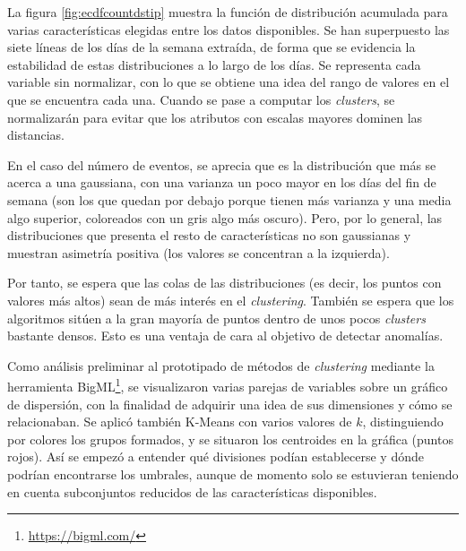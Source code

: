 La figura \ref{fig:ecdfcountdstip} muestra la función de distribución acumulada para varias características elegidas entre los datos disponibles.
Se han superpuesto las siete líneas de los días de la semana extraída, de forma que se evidencia la estabilidad de estas distribuciones a lo largo de los días.
Se representa cada variable sin normalizar, con lo que se obtiene una idea del rango de valores en el que se encuentra cada una.
Cuando se pase a computar los \emph{clusters}, se normalizarán para evitar que los atributos con escalas mayores dominen las distancias.

En el caso del número de eventos, se aprecia que es la distribución que más se acerca a una gaussiana, con una varianza un poco mayor en los días del fin de semana
(son los que quedan por debajo porque tienen más varianza y una media algo superior, coloreados con un gris algo más oscuro).
Pero, por lo general, las distribuciones que presenta el resto de características no son gaussianas y muestran asimetría positiva (los valores se concentran a la izquierda).

Por tanto, se espera que las colas de las distribuciones (es decir, los puntos con valores más altos) sean de más interés en el \emph{clustering}.
También se espera que los algoritmos sitúen a la gran mayoría de puntos dentro de unos pocos \emph{clusters} bastante densos.
Esto es una ventaja de cara al objetivo de detectar anomalías.

Como análisis preliminar al prototipado de métodos de \emph{clustering} mediante la herramienta BigML\footnote{\url{https://bigml.com/}},
se visualizaron varias parejas de variables sobre un gráfico de dispersión, con la finalidad de adquirir una idea de sus dimensiones y cómo se relacionaban.
Se aplicó también K-Means con varios valores de $k$, distinguiendo por colores los grupos formados, y se situaron los centroides en la gráfica (puntos rojos).
Así se empezó a entender qué divisiones podían establecerse y dónde podrían encontrarse los umbrales,
aunque de momento solo se estuvieran teniendo en cuenta subconjuntos reducidos de las características disponibles.

